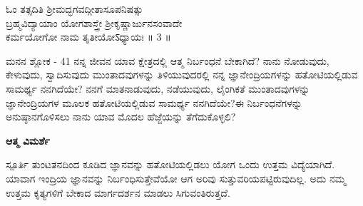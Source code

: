 \begin{center}
ಓಂ ತತ್ಸದಿತಿ ಶ್ರೀಮದ್ಭಗವದ್ಗೀತಾಸೂಪನಿಷತ್ಸು \\ಬ್ರಹ್ಮವಿದ್ಯಾಯಾಂ ಯೋಗಶಾಸ್ತ್ರೇ ಶ್ರೀಕೃಷ್ಣಾರ್ಜುನಸಂವಾದೇ\\
ಕರ್ಮಯೋಗೋ ನಾಮ ತೃತೀಯೋऽಧ್ಯಾಯಃ ॥ 3 ॥
\end{center}

\newpage
\begin{mananam}{\mananamfont ಮನನ ಶ್ಲೋಕ - \textenglish{41}}
\footnotesize \mananamtext ನನ್ನ ಜೀವನ ಯಾವ ಕ್ಷೇತ್ರದಲ್ಲಿ ಆತ್ಮ ನಿರ್ಬಂಧನೆ ಬೇಕಾಗಿದೆ? ನಾನು ನೋಡುವುದು, ಕೇಳುವುದು, ಸ್ವಾದಿಸುವುದು ಮುಂತಾದವುಗಳನ್ನು ತಿಳಿಯುವುದರಲ್ಲಿ ನನ್ನ ಜ್ಞಾನೇಂದ್ರಿಯಗಳನ್ನು ಹತೋಟಿಯಲ್ಲಿಡುವ ಸಾಮರ್ಥ್ಯ ನನಗಿದೆಯೇ? ನನಗೆ ಮಾತನಾಡುವುದು, ನಡೆಯುವುದು, ಲೈಂಗಿಕತೆ ಮುಂತಾದವುಗಳನ್ನು ಜ್ಞಾನೇಂದ್ರಿಯಗಳ ಮೂಲಕ ಹತೋಟಿಯಲ್ಲಿಡುವ ಸಾಮರ್ಥ್ಯ ನನಗಿದೆಯೇ?ಈ ನಿರ್ಬಂಧನೆಗಳನ್ನು ಅನುಷ್ಠಾನಗೊಳಿಸಲು ನಾನು ಯಾವ ಮೊದಲ ಹೆಜ್ಜೆಯನ್ನು ತೆಗೆದುಕೊಳ್ಳಲಿ?
\end{mananam}
\WritingHand\enspace\textbf{ಆತ್ಮ ವಿಮರ್ಶೆ}\\
\begin{inspiration}{\mananamfont ಸ್ಪೂರ್ತಿ}
\footnotesize \mananamtext ತುಂಟತನದಿಂದ ಕೂಡಿದ ಜ್ಞಾನವನ್ನು ಹತೋಟಿಯಲ್ಲಿಡಲು ಯೋಗ ಒಂದು ಉತ್ತಮ ವಿದ್ಯೆಯಾಗಿದೆ. ಯಾವಾಗ ಇಂದ್ರಿಯ ಜ್ಞಾನವನ್ನು ನಿರ್ಬಂಧಿಸುತ್ತೇವೆಯೋ ಆಗ ಅರಿವು ಸುತ್ತುವರಿಯಪಟ್ಟಿರುವುದಿಲ್ಲ. ಅದು ನಮ್ಮ ಉತ್ತಮ  ಕೃತ್ಯಗಳಿಗೆ ಬೇಕಾದ ಮಾರ್ಗದರ್ಶನ ಮಾಡಲು ಸಿಗುವಂತಿರುತ್ತದೆ.
\end{inspiration}
\newpage



